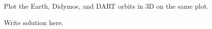 

%
%

\newcommand{\hmwkTitle}{Homework 00 - Numerical 2BP}
\newcommand{\hmwkDueDate}{February 4th, 2025}
\newcommand{\hmwkDueTime}{11:59 PM}
\newcommand{\hmwkClass}{ENAE 404 - 0101}
\newcommand{\hmwkClassTime}{09:30}
\newcommand{\hmwkClassInstructor}{Dr. Barbee}
\newcommand{\hmwkAuthorName}{\textbf{Vai Srivastava}}
\newcommand{\hmwkCompletionDate}{\today}



\maketitle

\pagebreak

\begin{hwkProblem}{1}{}

	Plot the Earth, Didymos, and DART orbits in 3D on the same plot. 

	\hwkSol

	Write solution here.

\end{hwkProblem}


